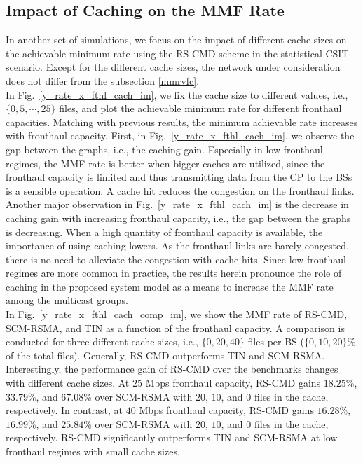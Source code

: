\documentclass[12pt,draftcls,onecolumn]{IEEEtran}
\theoremstyle{remark}
\theoremstyle{definition}
\begin{document}
{\subsection{Impact of Caching on the MMF Rate}
In another set of simulations, we focus on the impact of different cache sizes on the achievable minimum rate using the RS-CMD scheme in the statistical CSIT scenario. Except for the different cache sizes, the network under consideration does not differ from the subsection \ref{mmrvfc}. \\
\indent In Fig.~\ref{y_rate_x_fthl_cach_im}, we fix the cache size to different values, i.e., $\{0,5,\cdots,25\}$ files, and plot the achievable minimum rate for different fronthaul capacities. Matching with previous results, the minimum achievable rate increases with fronthaul capacity. First, in Fig.~\ref{y_rate_x_fthl_cach_im}, we observe the gap between the graphs, i.e., the caching gain. Especially in low fronthaul regimes, the MMF rate is better when bigger caches are utilized, since the fronthaul capacity is limited and thus transmitting data from the CP to the BSs is a sensible operation. A cache hit reduces the congestion on the fronthaul links. \\
\indent Another major observation in Fig.~\ref{y_rate_x_fthl_cach_im} is the decrease in caching gain with increasing fronthaul capacity, i.e., the gap between the graphs is decreasing. When a high quantity of fronthaul capacity is available, the importance of using caching lowers. As the fronthaul links are barely congested, there is no need to alleviate the congestion with cache hits.
Since low fronthaul regimes are more common in practice, the results herein pronounce the role of caching in the proposed system model as a means to increase the MMF rate among the multicast groups. \\
\indent In Fig.~\ref{y_rate_x_fthl_cach_comp_im}, we show the MMF rate of RS-CMD, SCM-RSMA, and TIN as a function of the fronthaul capacity. A comparison is conducted for three different cache sizes, i.e., $\{0,20,40\}$ files per BS ($\{0,10,20\}$\% of the total files). Generally, RS-CMD outperforms TIN and SCM-RSMA. Interestingly, the performance gain of RS-CMD over the benchmarks changes with different cache sizes. At $25$ Mbps fronthaul capacity, RS-CMD gains $18.25$\%, $33.79$\%, and $67.08$\% over SCM-RSMA with $20$, $10$, and $0$ files in the cache, respectively. In contrast, at $40$ Mbps fronthaul capacity, RS-CMD gains $16.28$\%, $16.99$\%, and $25.84$\% over SCM-RSMA with $20$, $10$, and $0$ files in the cache, respectively. RS-CMD significantly outperforms TIN and SCM-RSMA at low fronthaul regimes with small cache sizes. 
}
\end{document}
